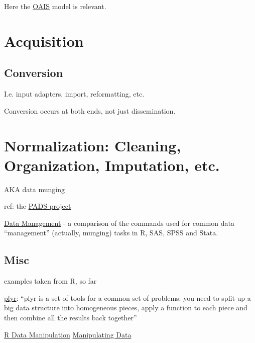 \documentclass[reqno,12pt]{tufte-book}
\numberwithin{equation}{subsection}
\begin{document}
\begin{ednote}
  Here the
  \href{http://en.wikipedia.org/wiki/Open_Archival_Information_System}{OAIS}
  model is relevant.
\end{ednote}

\chapter{Acquisition}

\section{Conversion}
\label{sect:conversion}

I.e. input adapters, import, reformatting, etc.

Conversion occurs at both ends, not just dissemination.

\chapter{Normalization: Cleaning, Organization, Imputation, etc.}

AKA data munging

ref:  the \href{http://www.padsproj.org/index.html}{PADS project}

\href{http://r4stats.com/examples/data-management/}{Data Management} - a comparison of the commands used for common data ``management'' (actually, munging) tasks in R, SAS, SPSS and Stata.

\section{Misc}

\begin{remark}
  examples taken from R, so far
\end{remark}

\href{http://plyr.had.co.nz/}{plyr}: ``plyr is a set of tools for a
common set of problems: you need to split up a big data structure into
homogeneous pieces, apply a function to each piece and then combine
all the results back together''


\href{http://rprogramming.net/r-data-manipulation/}{R Data Manipulation}
\href{http://www.cookbook-r.com/Manipulating\_data/}{Manipulating Data}
\end{document}
